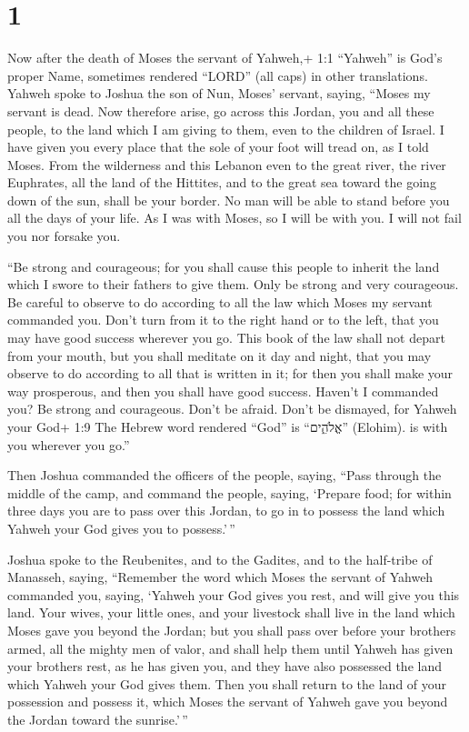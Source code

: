 \hypertarget{section}{%
\section{1}\label{section}}

 Now after the death of Moses the servant of Yahweh,+ 1:1
``Yahweh'' is God's proper Name, sometimes rendered ``LORD'' (all caps)
in other translations. Yahweh spoke to Joshua the son of Nun, Moses'
servant, saying,  ``Moses my servant is dead. Now therefore
arise, go across this Jordan, you and all these people, to the land
which I am giving to them, even to the children of Israel. 
I have given you every place that the sole of your foot will tread on,
as I told Moses.  From the wilderness and this Lebanon even
to the great river, the river Euphrates, all the land of the Hittites,
and to the great sea toward the going down of the sun, shall be your
border.  No man will be able to stand before you all the
days of your life. As I was with Moses, so I will be with you. I will
not fail you nor forsake you.

 ``Be strong and courageous; for you shall cause this people
to inherit the land which I swore to their fathers to give them.
 Only be strong and very courageous. Be careful to observe
to do according to all the law which Moses my servant commanded you.
Don't turn from it to the right hand or to the left, that you may have
good success wherever you go.  This book of the law shall
not depart from your mouth, but you shall meditate on it day and night,
that you may observe to do according to all that is written in it; for
then you shall make your way prosperous, and then you shall have good
success.  Haven't I commanded you? Be strong and courageous.
Don't be afraid. Don't be dismayed, for Yahweh your God+ 1:9 The Hebrew
word rendered ``God'' is ``אֱלֹהִ֑ים'' (Elohim). is with you wherever
you go.''

 Then Joshua commanded the officers of the people, saying,
 ``Pass through the middle of the camp, and command the
people, saying, `Prepare food; for within three days you are to pass
over this Jordan, to go in to possess the land which Yahweh your God
gives you to possess.'\,''

 Joshua spoke to the Reubenites, and to the Gadites, and to
the half-tribe of Manasseh, saying,  ``Remember the word
which Moses the servant of Yahweh commanded you, saying, `Yahweh your
God gives you rest, and will give you this land.  Your
wives, your little ones, and your livestock shall live in the land which
Moses gave you beyond the Jordan; but you shall pass over before your
brothers armed, all the mighty men of valor, and shall help them
 until Yahweh has given your brothers rest, as he has given
you, and they have also possessed the land which Yahweh your God gives
them. Then you shall return to the land of your possession and possess
it, which Moses the servant of Yahweh gave you beyond the Jordan toward
the sunrise.'\,''

